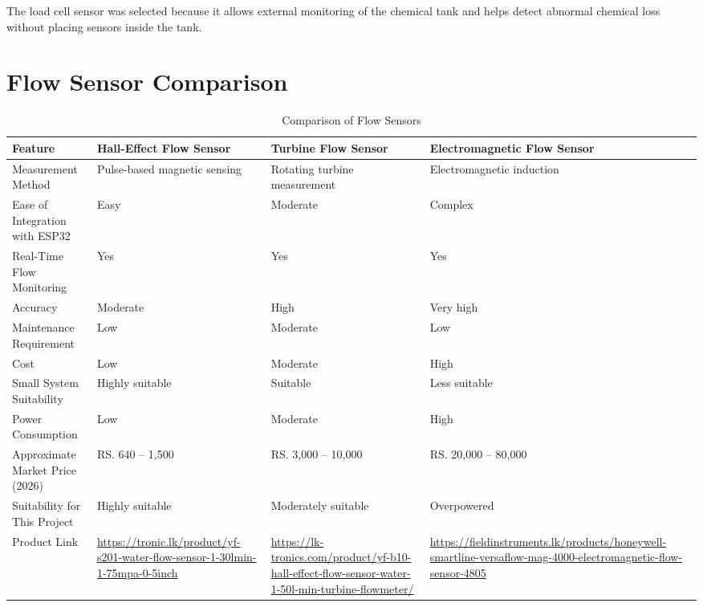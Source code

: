 \documentclass[12pt,a4paper]{report}
\begin{document}
The load cell sensor was selected because it allows external monitoring of the chemical tank and helps detect abnormal chemical loss without placing sensors inside the tank.

\section{Flow Sensor Comparison}

\begin{table}[H]
\centering
\small
\begin{tabularx}{\textwidth}{|p{3cm}|>{\raggedright\arraybackslash}X|>{\raggedright\arraybackslash}X|>{\raggedright\arraybackslash}X|}
\hline
\textbf{Feature} & \textbf{Hall-Effect Flow Sensor} & \textbf{Turbine Flow Sensor} & \textbf{Electromagnetic Flow Sensor} \\
\hline

Measurement Method &
Pulse-based magnetic sensing &
Rotating turbine measurement &
Electromagnetic induction \\
\hline

Ease of Integration with ESP32 &
Easy &
Moderate &
Complex \\
\hline

Real-Time Flow Monitoring &
Yes &
Yes &
Yes \\
\hline

Accuracy &
Moderate &
High &
Very high \\
\hline

Maintenance Requirement &
Low &
Moderate &
Low \\
\hline

Cost &
Low &
Moderate &
High \\
\hline

Small System Suitability &
Highly suitable &
Suitable &
Less suitable \\
\hline

Power Consumption &
Low &
Moderate &
High \\
\hline

Approximate Market Price (2026) &
RS. 640 -- 1,500 &
RS. 3,000 -- 10,000 &
RS. 20,000 -- 80,000 \\
\hline

Suitability for This Project &
Highly suitable &
Moderately suitable &
Overpowered \\
\hline

Product Link &
\url{https://tronic.lk/product/yf-s201-water-flow-sensor-1-30lmin-1-75mpa-0-5inch} &
\url{https://lk-tronics.com/product/yf-b10-hall-effect-flow-sensor-water-1-50l-min-turbine-flowmeter/} &
\url{https://fieldinstruments.lk/products/honeywell-smartline-versaflow-mag-4000-electromagnetic-flow-sensor-4805} \\
\hline

\end{tabularx}
\caption{Comparison of Flow Sensors}
\end{table}
\end{document}
